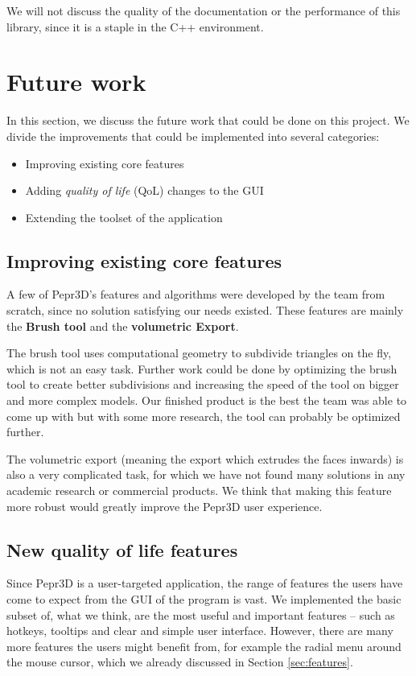 We will not discuss the quality of the documentation or the performance of this library, since it is a staple in the C++ environment.

\section{Future work}

In this section, we discuss the future work that could be done on this project. We divide the improvements that could be implemented into several categories:

\begin{itemize}
\item Improving existing core features
\item Adding \textit{quality of life} (QoL) changes to the GUI
\item Extending the toolset of the application
\end{itemize}

\subsection{Improving existing core features}

A few of Pepr3D's features and algorithms were developed by the team from scratch, since no solution satisfying our needs existed. These features are mainly the \textbf{Brush tool} and the \textbf{volumetric Export}. 

The brush tool uses computational geometry to subdivide triangles on the fly, which is not an easy task. Further work could be done by optimizing the brush tool to create better subdivisions and increasing the speed of the tool on bigger and more complex models. Our finished product is the best the team was able to come up with but with some more research, the tool can probably be optimized further.

The volumetric export (meaning the export which extrudes the faces inwards) is also a very complicated task, for which we have not found many solutions in any academic research or commercial products. We think that making this feature more robust would greatly improve the Pepr3D user experience.

\subsection{New quality of life features}

Since Pepr3D is a user-targeted application, the range of features the users have come to expect from the GUI of the program is vast. We implemented the basic subset of, what we think, are the most useful and important features -- such as hotkeys, tooltips and clear and simple user interface. However, there are many more features the users might benefit from, for example the radial menu around the mouse cursor, which we already discussed in Section \ref{sec:features}.

